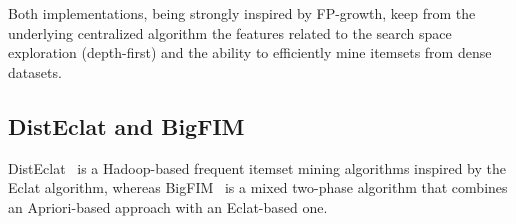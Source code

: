 \documentclass[preprint,review,12pt]{elsarticle}
\begin{document}
Both implementations, being strongly inspired by FP-growth, keep from the
underlying centralized algorithm the features related to the search space exploration
(depth-first) and the ability to efficiently mine itemsets from dense datasets.


\subsection{DistEclat and BigFIM}
\label{bigfim}
DistEclat~\cite{bigfim} is a Hadoop-based frequent itemset mining algorithms inspired 
by the Eclat algorithm, whereas BigFIM~\cite{bigfim} is a mixed two-phase algorithm that combines an Apriori-based approach with 
an Eclat-based one.

%

%
\end{document}
